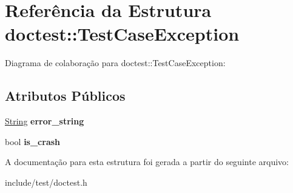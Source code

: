 \hypertarget{structdoctest_1_1TestCaseException}{}\section{Referência da Estrutura doctest\+:\+:Test\+Case\+Exception}
\label{structdoctest_1_1TestCaseException}


Diagrama de colaboração para doctest\+:\+:Test\+Case\+Exception\+:
\subsection*{Atributos Públicos}
\begin{DoxyCompactItemize}
\item 
\mbox{\label{structdoctest_1_1TestCaseException_a656c8971ccbedc7d3a0a38f7c6af927e}} 
\hyperlink{classdoctest_1_1String}{String} {\bfseries error\+\_\+string}
\item 
\mbox{\label{structdoctest_1_1TestCaseException_af30d801dae6dd2f4ea01690bbf5faeca}} 
bool {\bfseries is\+\_\+crash}
\end{DoxyCompactItemize}


A documentação para esta estrutura foi gerada a partir do seguinte arquivo\+:\begin{DoxyCompactItemize}
\item 
include/test/doctest.\+h\end{DoxyCompactItemize}
